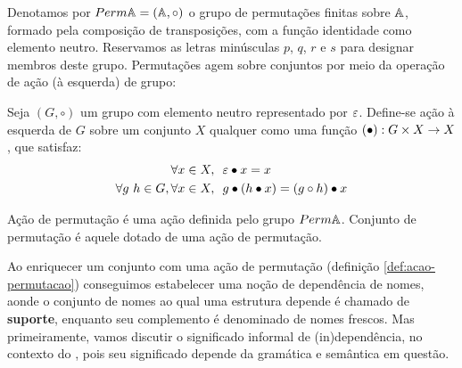 Denotamos por $Perm \mathbb{A} = (\mathbb{A}, \circ)$ o grupo de permutações finitas sobre $\mathbb{A}$, formado pela composição de transposições, com a função identidade como elemento neutro. Reservamos as letras minúsculas $p$, $q$, $r$ e $s$ para designar membros deste grupo. Permutações agem sobre conjuntos por meio da operação de ação (à esquerda) de grupo:
\begin{definicao}
	Seja $(G, \circ)$ um grupo com elemento neutro representado por $\varepsilon$.  Define-se ação à esquerda de $G$ sobre um conjunto $X$ qualquer como uma função $(\bullet) : G \times X \rightarrow X$,
	que satisfaz:
	\begin{align}
		\forall x \in X,&~~ \varepsilon \bullet x = x \label{eq:act-neutral}\\
		\forall g~h \in G, \forall x \in X,&~~ g \bullet (h \bullet x) = (g \circ h) \bullet x \label{eq:act-compat}
	\end{align}
\end{definicao}\noindent
\begin{definicao}\label{def:acao-permutacao}
	Ação de permutação é uma ação definida pelo grupo $Perm \mathbb{A}$. Conjunto de permutação é aquele dotado de uma ação de permutação.
\end{definicao}\noindent

Ao enriquecer um conjunto com uma ação de permutação (definição \ref{def:acao-permutacao}) conseguimos estabelecer uma noção de dependência de nomes, aonde o conjunto de nomes ao qual uma estrutura depende é chamado de \textbf{suporte}, enquanto seu complemento é denominado de nomes frescos.
Mas primeiramente, vamos discutir o significado informal de (in)dependência, no contexto do \lcalc, pois seu significado depende da gramática e semântica em questão.

